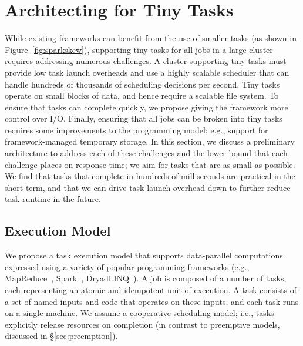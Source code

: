 \section{Architecting for Tiny Tasks}
\label{sec:architecture}

While existing frameworks can benefit from the use of smaller tasks (as shown
in Figure~\ref{fig:sparkskew}), supporting tiny tasks for all jobs in a large cluster
requires addressing numerous challenges.
A cluster supporting tiny tasks must provide low task launch overheads and use
a highly scalable scheduler that can
handle hundreds of thousands of scheduling decisions per second. %
Tiny tasks operate on
small blocks of data, and hence require a scalable file system. To ensure that
tasks can complete quickly, we propose giving the framework more control
over I/O. %
Finally, ensuring
that all jobs can be broken into tiny tasks requires some improvements
to the programming model; e.g., support for framework-managed temporary storage.
In this section, we discuss a preliminary architecture to address
each of these challenges and the lower bound that each challenge places
on response time; we aim for tasks that are as small as possible.
We find that tasks that complete in hundreds of milliseconds
are practical in the short-term, and that we can drive task launch overhead
down to further reduce task runtime in the future.

\subsection{Execution Model}
We propose a task execution model that supports data-parallel computations
expressed using a variety of popular programming frameworks (e.g.,
MapReduce~\cite{dean2004mapreduce}, Spark~\cite{zaharia2010spark},
DryadLINQ~\cite{yu2008dryadlinq}).
A job is composed of a number of tasks, each representing an atomic
and idempotent unit of execution. A task consists of a set of named inputs
and code that operates on these inputs, and each task runs on a single machine.
We assume a cooperative scheduling model; i.e., tasks explicitly release
resources on completion (in contrast to preemptive models, discussed in
\S\ref{sec:preemption}).



